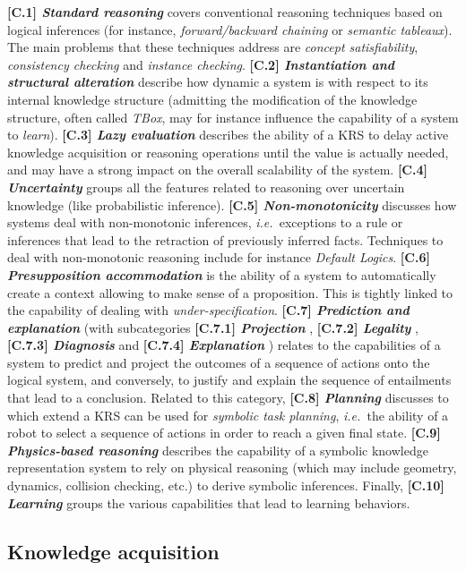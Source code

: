 \documentclass[journal]{IEEEtran}
\newcommand{\ie}{{\textit{i.e.\ }}}
\newcommand{\taxon}[2]{%
    \textbf{[#1] \emph{#2}}
}
\begin{document}
\taxon{C.1}{Standard reasoning} covers conventional reasoning techniques based
on logical inferences (for instance, \emph{forward/backward chaining} or
\emph{semantic tableaux}). The main problems that these techniques address are
\emph{concept satisfiability}, \emph{consistency checking} and \emph{instance
checking}. \taxon{C.2}{Instantiation and structural alteration} describe how
dynamic a system is with respect to its internal knowledge structure (admitting
the modification of the knowledge structure, often called \emph{TBox}, may
for instance influence the capability of a system to \emph{learn}).
\taxon{C.3}{Lazy evaluation} describes the ability of a KRS to delay active
knowledge acquisition or reasoning operations until the value is actually
needed, and may have a strong impact on the overall scalability of the system.
\taxon{C.4}{Uncertainty} groups all the features related to reasoning over
uncertain knowledge (like probabilistic inference).
\taxon{C.5}{Non-monotonicity} discusses how systems deal with non-monotonic
inferences, \ie exceptions to a rule or inferences that lead to the retraction
of previously inferred facts. Techniques to deal with non-monotonic reasoning
include for instance \emph{Default Logics}.  \taxon{C.6}{Presupposition
accommodation} is the ability of a system to automatically create a context
allowing to make sense of a proposition. This is tightly linked to the 
capability of dealing with \emph{under-specification}. \taxon{C.7}{Prediction 
and explanation} (with subcategories \taxon{C.7.1}{Projection}, 
\taxon{C.7.2}{Legality}, \taxon{C.7.3}{Diagnosis} and \taxon{C.7.4}{Explanation}) 
relates to the capabilities of a system to predict
and project the outcomes of a sequence of actions onto the logical system, and
conversely, to justify and explain the sequence of entailments that lead to a
conclusion. Related to this category, \taxon{C.8}{Planning} discusses to which
extend a KRS can be used for \emph{symbolic task planning}, \ie the ability of
a robot to select a sequence of actions in order to reach a given final state.
\taxon{C.9}{Physics-based reasoning} describes the capability of a symbolic
knowledge representation system to rely on physical reasoning (which may include
geometry, dynamics, collision checking, etc.) to derive symbolic inferences.
Finally, \taxon{C.10}{Learning} groups the various capabilities that lead to
learning behaviors.



\subsection{Knowledge acquisition}
\end{document}
